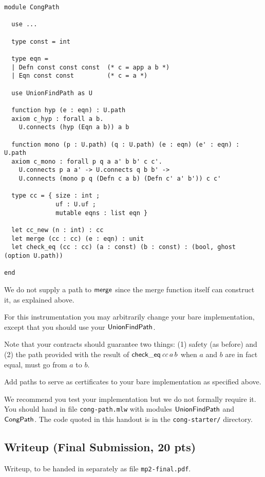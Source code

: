 \documentclass[11pt]{article}
\begin{document}
\begin{lstlisting}
module CongPath

  use ...
  
  type const = int

  type eqn =
  | Defn const const const  (* c = app a b *)
  | Eqn const const         (* c = a *)

  use UnionFindPath as U

  function hyp (e : eqn) : U.path
  axiom c_hyp : forall a b.
    U.connects (hyp (Eqn a b)) a b

  function mono (p : U.path) (q : U.path) (e : eqn) (e' : eqn) : U.path
  axiom c_mono : forall p q a a' b b' c c'.
    U.connects p a a' -> U.connects q b b' ->
    U.connects (mono p q (Defn c a b) (Defn c' a' b')) c c'

  type cc = { size : int ;
              uf : U.uf ;
              mutable eqns : list eqn }

  let cc_new (n : int) : cc
  let merge (cc : cc) (e : eqn) : unit
  let check_eq (cc : cc) (a : const) (b : const) : (bool, ghost (option U.path))

end
\end{lstlisting}

We do not supply a path to $\mathsf{merge}$ since the merge function itself
can construct it, as explained above.

For this instrumentation you may arbitrarily change your bare
implementation, except that you should use your $\mathsf{UnionFindPath}$.

Note that your contracts should guarantee two things: (1) safety (as
before) and (2) the path provided with the result of
$\mathsf{check\_eq}\, \mathit{cc}\, a\, b$ when $a$ and $b$ are in fact equal,
must go from $a$ to $b$.

\begin{task}[40 pts]
  Add paths to serve as certificates to your bare implementation as
  specified above.
\end{task}

We recommend you test your implementation but we do not formally require
it.  You should hand in file \verb|cong-path.mlw| with modules
$\mathsf{UnionFindPath}$ and $\mathsf{CongPath}$.  The code quoted in this handout
is in the \verb|cong-starter/| directory.

\subsection{Writeup (Final Submission, 20 pts)}

\begin{task}[20 pts]
Writeup, to be handed in separately as file \verb|mp2-final.pdf|.  
\end{task}
\end{document}
